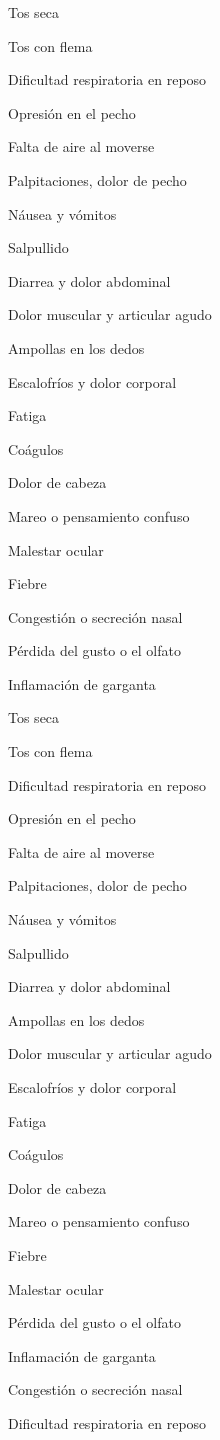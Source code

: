 Tos seca

Tos con flema

Dificultad respiratoria en reposo

Opresión en el pecho

Falta de aire al moverse

Palpitaciones, dolor de pecho

Náusea y vómitos

Salpullido

Diarrea y dolor abdominal

Dolor muscular y articular agudo

Ampollas en los dedos

Escalofríos y dolor corporal

Fatiga

Coágulos

Dolor de cabeza

Mareo o pensamiento confuso

Malestar ocular

Fiebre

Congestión o secreción nasal

Pérdida del gusto o el olfato

Inflamación de garganta

Tos seca

Tos con flema

Dificultad respiratoria en reposo

Opresión en el pecho

Falta de aire al moverse

Palpitaciones, dolor de pecho

Náusea y vómitos

Salpullido

Diarrea y dolor abdominal

Ampollas en los dedos

Dolor muscular y articular agudo

Escalofríos y dolor corporal

Fatiga

Coágulos

Dolor de cabeza

Mareo o pensamiento confuso

Fiebre

Malestar ocular

Pérdida del gusto o el olfato

Inflamación de garganta

Congestión o secreción nasal

Dificultad respiratoria en reposo

